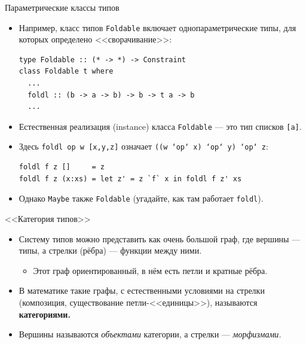 \documentclass[xcolor=dvipsnames]{beamer}
\begin{document}
\begin{frame}[fragile]{Параметрические классы типов}

\begin{itemize}[<+->]
 \item Например, класс типов \texttt{Foldable} включает однопараметрические типы, для которых определено <<сворачивание>>:
 
{\scriptsize
\begin{verbatim}
type Foldable :: (* -> *) -> Constraint
class Foldable t where
  ...
  foldl :: (b -> a -> b) -> b -> t a -> b
  ...
\end{verbatim}

}

\item Естественная реализация (instance) класса \texttt{Foldable} --- это тип списков \texttt{[a]}.
\item Здесь \texttt{foldl op w}\texttt{ [x,y,z]} означает
\texttt{((w `op` x) `op` y) `op` z}:

{\scriptsize
\begin{verbatim}
foldl f z []     = z
foldl f z (x:xs) = let z' = z `f` x in foldl f z' xs
\end{verbatim}
}
\item Однако \texttt{Maybe} также \texttt{Foldable} (угадайте, как там работает \texttt{foldl}).

\end{itemize}

\end{frame}

\begin{frame}{<<Категория типов>>}
 
 \begin{itemize}[<+->]
  \item Систему типов можно представить как очень большой граф,
  где вершины --- типы, а стрелки (рёбра) --- функции между ними.
  \begin{itemize}
  \item Этот граф ориентированный, в нём есть петли и кратные рёбра.
  \end{itemize}
  \item В математике такие графы, с естественными условиями на стрелки (композиция, существование петли-<<единицы>>), называются {\bf категориями.}
    \item Вершины называются {\em объектами} категории, а стрелки --- {\em морфизмами.}
 \end{itemize}

\end{frame}
\end{document}
